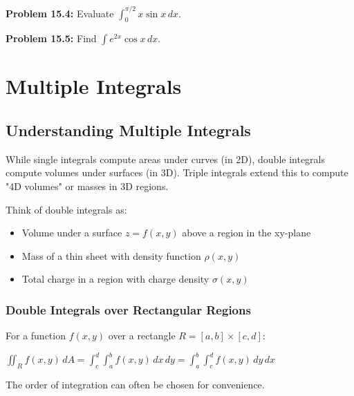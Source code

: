 \documentclass[12pt,a4paper]{book}
\theoremstyle{definition}
\begin{document}
\textbf{Problem 15.4:} Evaluate $\int_0^{\pi/2} x \sin x \, dx$.

\textbf{Problem 15.5:} Find $\int e^{2x} \cos x \, dx$.

\chapter{Multiple Integrals}

\section{Understanding Multiple Integrals}

\begin{intuition}
While single integrals compute areas under curves (in 2D), double integrals compute volumes under surfaces (in 3D). Triple integrals extend this to compute "4D volumes" or masses in 3D regions.

Think of double integrals as:
\begin{itemize}
    \item Volume under a surface $z = f(x,y)$ above a region in the xy-plane
    \item Mass of a thin sheet with density function $\rho(x,y)$
    \item Total charge in a region with charge density $\sigma(x,y)$
\end{itemize}
\end{intuition}

\subsection{Double Integrals over Rectangular Regions}

\begin{keyformula}
For a function $f(x,y)$ over a rectangle $R = [a,b] \times [c,d]$:

$\iint_R f(x,y) \, dA = \int_c^d \int_a^b f(x,y) \, dx \, dy = \int_a^b \int_c^d f(x,y) \, dy \, dx$

The order of integration can often be chosen for convenience.
\end{keyformula}
\end{document}
